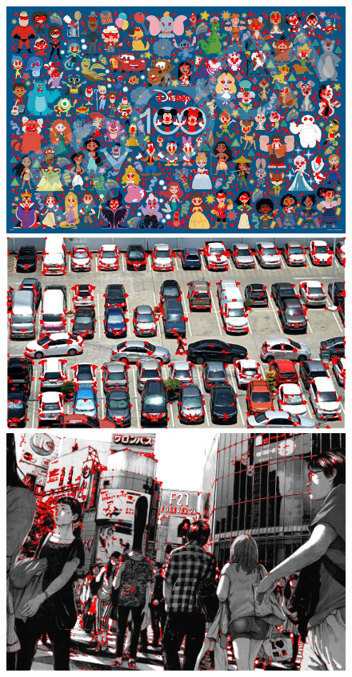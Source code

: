 \begin{figure}[ht]
	\centering
	\begin{minipage}[hb]{0.3\textwidth}
		\centering
		\includegraphics[width=\textwidth]{Graphics/bordes_disney.jpg}
	\end{minipage}
	\hfill
	\begin{minipage}[hb]{0.3\textwidth}
		\centering
		\includegraphics[width=\textwidth]{Graphics/bordes_cars.jpg}
	\end{minipage}
	\hfill
	\begin{minipage}[hb]{0.3\textwidth}
		\centering
		\includegraphics[width=\textwidth]{Graphics/bordes_japan.jpg}

\end{minipage}
\end{figure}
